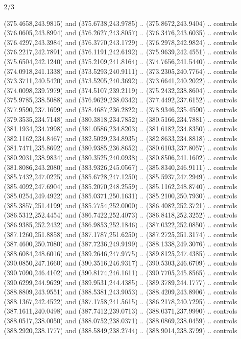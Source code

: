 \begin{flagdescription}{2/3}
\begin{scope}[xshift=0.5\flaglength,yshift=0.5\flagwidth,scale=\flagwidth/495.65]
\begin{scope}[y=0.8pt, x=0.8pt, yscale=-1,shift={(-463.76,-309.78)}]
  (375.4658,243.9815) and (375.6738,243.9785) .. (375.8672,243.9404) .. controls
  (376.0605,243.8994) and (376.2627,243.8057) .. (376.3476,243.6035) .. controls
  (376.4297,243.3984) and (376.3770,243.1729) .. (376.2978,242.9824) .. controls
  (376.2217,242.7891) and (376.1191,242.6192) .. (375.9639,242.4551) .. controls
  (375.6504,242.1240) and (375.2109,241.8164) .. (374.7656,241.5440) .. controls
  (374.0918,241.1338) and (373.5293,240.9111) .. (373.2305,240.7764) .. controls
  (373.3711,240.5420) and (373.5205,240.3692) .. (373.6641,240.2022) .. controls
  (374.0098,239.7979) and (374.5107,239.2119) .. (375.2432,238.8604) .. controls
  (375.9785,238.5088) and (376.9629,238.0342) .. (377.4492,237.6152) .. controls
  (377.9590,237.1699) and (378.4687,236.2822) .. (378.9346,235.4590) .. controls
  (379.3535,234.7148) and (380.3818,234.7852) .. (380.5166,234.7881) .. controls
  (381.1934,234.7998) and (381.0586,234.8203) .. (381.6182,234.8350) .. controls
  (382.1162,234.8467) and (382.5029,234.8935) .. (382.8633,234.8818) .. controls
  (381.7471,235.8692) and (380.9385,236.8652) .. (380.6103,237.8057) .. controls
  (380.2031,238.9834) and (380.3525,240.0938) .. (380.8506,241.1602) .. controls
  (381.8086,243.2080) and (383.9326,245.0567) .. (385.8340,246.9111) .. controls
  (385.7432,247.0225) and (385.6728,247.1250) .. (385.5937,247.2949) .. controls
  (385.4092,247.6904) and (385.2070,248.2559) .. (385.1162,248.8740) .. controls
  (385.0254,249.4922) and (385.0371,250.1631) .. (385.2100,250.7930) .. controls
  (385.3857,251.4199) and (385.7754,252.0000) .. (386.4082,252.3721) .. controls
  (386.5312,252.4454) and (386.7422,252.4073) .. (386.8418,252.3252) .. controls
  (386.9385,252.2432) and (386.9853,252.1846) .. (387.0322,252.0850) .. controls
  (387.1260,251.8858) and (387.1787,251.6250) .. (387.2725,251.3174) .. controls
  (387.4600,250.7080) and (387.7236,249.9199) .. (388.1338,249.3076) .. controls
  (388.6084,248.6016) and (389.2646,247.9775) .. (389.8125,247.4385) .. controls
  (390.0850,247.1660) and (390.3516,246.9317) .. (390.5303,246.6709) .. controls
  (390.7090,246.4102) and (390.8174,246.1611) .. (390.7705,245.8565) .. controls
  (390.6299,244.9629) and (389.9531,244.4385) .. (389.3789,244.1777) .. controls
  (388.8809,243.9551) and (388.5381,243.9053) .. (388.4209,243.8906) .. controls
  (388.1367,242.4522) and (387.1758,241.5615) .. (386.2178,240.7295) .. controls
  (387.1611,240.0498) and (387.7412,239.0713) .. (388.0371,237.9990) .. controls
  (388.0517,238.0050) and (388.0752,238.0371) .. (388.0869,238.0459) .. controls
  (388.2920,238.1777) and (388.5849,238.2744) .. (388.9014,238.3799) .. controls

\end{scope}
\end{scope}
\end{flagdescription}

